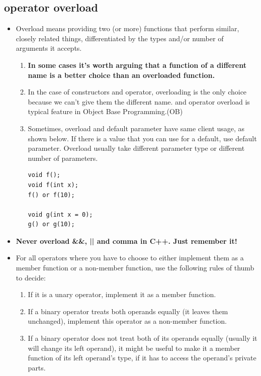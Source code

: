 \documentclass[a4paper,11pt,twoside]{book}
\begin{document}
\subsection{operator overload}
\begin{itemize}
	\item Overload means providing two (or more) functions that perform similar, closely related things, differentiated by the types and/or number of arguments it accepts.
	
	\begin{enumerate}
		\item \textbf{In some cases it's worth arguing that a function of a different name is a better choice than an overloaded function.}
		
		\item  In the case of constructors and operator, overloading is the only choice because we can't give them the different name. and operator overload is typical feature in Object Base Programming.(OB)
		
		\item Sometimes, overload and default parameter have same client usage, as shown below. If there is a value that you can use for a default, use default parameter. Overload usually take different parameter type or different number of parameters.
\begin{lstlisting}[numbers=none]
void f();
void f(int x);
f() or f(10);

void g(int x = 0);
g() or g(10);	
\end{lstlisting}				
	\end{enumerate}

	\item \textbf{Never overload \&\&, || and comma in C++.  Just remember it!}
	
	\item For all operators where you have to choose to either implement them as a member function or a non-member function, use the following rules of thumb to decide:
	\begin{enumerate}
		\item If it is a unary operator, implement it as a member function.
		
		\item If a binary operator treats both operands equally (it leaves them unchanged), implement this operator as a non-member function.
		
		\item If a binary operator does not treat both of its operands equally (usually it will change its left operand), it might be useful to make it a member function of its left operand’s type, if it has to access the operand's private parts.
	\end{enumerate}
	

\end{itemize}
\end{document}
